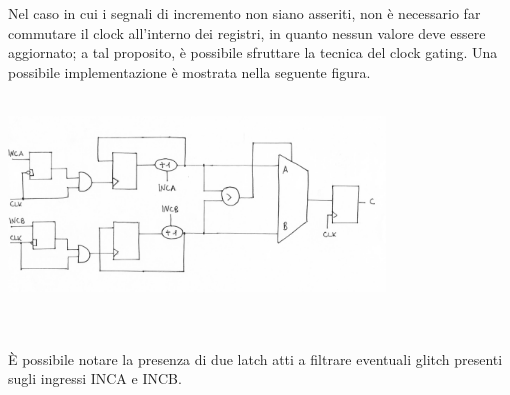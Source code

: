 \documentclass[11pt,  english, makeidx, a4paper, titlepage, oneside]{book}
\begin{document}
\\\\
Nel caso in cui i segnali di incremento non siano asseriti, non è necessario far commutare il clock all'interno dei registri, in quanto nessun valore deve essere aggiornato; a tal proposito, è possibile sfruttare la tecnica del clock gating. Una possibile implementazione è mostrata nella seguente figura.
\\\\
\centerline{\includegraphics[width=10cm]{./img/Lab_3/Clk_gating_img.png}}
\\\\
È possibile notare la presenza di due latch atti a filtrare eventuali glitch presenti sugli ingressi INCA e INCB.
\end{document}
